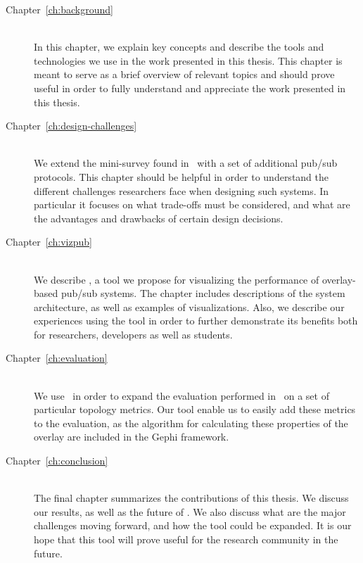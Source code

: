 \begin{description}
    \item[Chapter~\ref{ch:background}] \hfill \\

        In this chapter, we explain key concepts and describe the tools
        and technologies we use in the work presented in this thesis.
        This chapter is meant to serve as a brief overview of relevant
        topics and should prove useful in order to fully understand and
        appreciate the work presented in this thesis.

    \item[Chapter~\ref{ch:design-challenges}] \hfill \\

        We extend the mini-survey found in~\cite{Setty:2012} with a set
        of additional pub/sub protocols. This chapter should be helpful
        in order to understand the different challenges researchers face
        when designing such systems. In particular it focuses on what
        trade-offs must be considered, and what are the advantages and
        drawbacks of certain design decisions.

    \item[Chapter~\ref{ch:vizpub}] \hfill \\

        We describe \demo, a tool we propose for visualizing the
        performance of overlay-based pub/sub systems. The chapter
        includes descriptions of the system architecture, as well as
        examples of visualizations. Also, we describe our experiences
        using the tool in order to further demonstrate its benefits both
        for researchers, developers as well as students.

    \item[Chapter~\ref{ch:evaluation}] \hfill \\

       We use \demo~in order to expand the evaluation performed
       in~\cite{Setty:2012} on a set of particular topology metrics. Our
       tool enable us to easily add these metrics to the evaluation, as
       the algorithm for calculating these properties of the overlay are
       included in the Gephi framework.

    \item[Chapter~\ref{ch:conclusion}] \hfill \\

        The final chapter summarizes the contributions of this thesis.
        We discuss our results, as well as the future of \demo. We also
        discuss what are the major challenges moving forward, and how
        the tool could be expanded. It is our hope that this tool will
        prove useful for the research community in the future.

\end{description}
